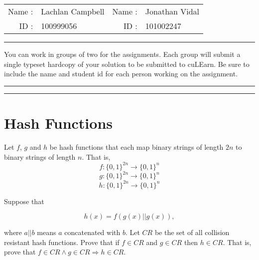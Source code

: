 \documentclass[12pt, letterpaper]{article}
\begin{document}
{\Large
\begin{tabular}{rm{6cm}rm{6cm}}
Name :  & Lachlan Campbell & Name : & Jonathan Vidal           \\
ID :    & 100999056   & ID :   & 101002247
\end{tabular}
}

\bigskip
\hrule
\bigskip


You can work in groups of two for the assignments. Each group will submit a single
typeset hardcopy of your solution to be submitted to cuLEarn. Be sure to include the name and student id for
each person working on the assignment.  

\bigskip   %
\hrule     %
\bigskip   %
\hrule     %

\section{Hash Functions}

Let $f$, $g$ and $h$ be hash functions that each map binary strings of length $2n$ to binary strings of length $n$. That is,
\[ f\colon \{0,1\}^{2n} \to \{0,1\}^n \]
\[ g\colon \{0,1\}^{2n} \to \{0,1\}^n \]
\[ h\colon \{0,1\}^{2n} \to \{0,1\}^n \]

Suppose that  

 \[h(x) = f( g(x) || g(x) ),\]

where $a||b$ means $a$ concatenated with $b$.  
Let $CR$ be the set of all collision resistant hash functions. Prove that if $f \in CR$ and $g \in CR$ then $h \in CR$. That is, prove that $f \in CR \land g \in CR \Rightarrow h \in CR$.
\end{document}
